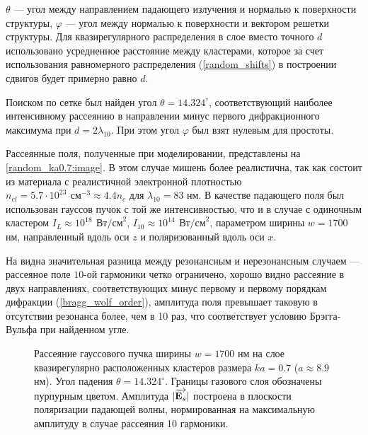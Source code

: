  $\theta$ --- угол между направлением падающего излучения и нормалью к поверхности структуры, $\varphi$ --- угол между нормалью к поверхности и вектором решетки структуры. Для квазирегулярного распределения в слое вместо точного $d$ использовано усредненное расстояние между кластерами, которое за счет использования равномерного распределения (\autoref{random_shifts}) в построении сдвигов будет примерно равно $d$.

Поиском по сетке был найден угол $\theta = 14.324^{\circ}$, соответствующий наиболее интенсивному рассеянию в направлении минус первого дифракционного максимума при $d = 2\lambda_{10}$. При этом угол $\varphi$ был взят нулевым для простоты.

Рассеянные поля, полученные при моделировании, представлены на \autoref{random_ka0.7:image}. В этом случае мишень более реалистична, так как состоит из материала с реалистичной электронной плотностью $n_{el} = 5.7 \cdot 10^{23}\:\,\textrm{см}^{-3} \approx 4.4 n_{c}$ для $\lambda_{10} = 83$ нм. В качестве падающего поля был использован гауссов пучок с той же интенсивностью, что и в случае с одиночным кластером $I_{L} \approx 10^{18}\:\,\textrm{Вт/см}^2$, $I_{10} \approx 10^{14}\:\,\textrm{Вт/см}^2$, параметром ширины $w = 1700$ нм, направленный вдоль оси $z$ и поляризованный вдоль оси $x$.

На  видна значительная разница между резонансным и нерезонансным случаем --- рассеяное поле $10$-ой гармоники четко ограничено, хорошо видно рассеяние в двух направлениях, соответствующих минус первому и первому порядкам дифракции (\autoref{bragg_wolf_order}), амплитуда поля превышает таковую в отсутствии резонанса более, чем в 10 раз, что соответствует условию Брэгга-Вульфа при найденном угле.

    \begin{figure}[H]
        \hfil
        \caption{Рассеяние гауссового пучка ширины $w = 1700$ нм на слое квазирегулярно расположенных кластеров размера $ka = 0.7$ ($a \approx 8.9$ нм). Угол падения $\theta = 14.324^{\circ}$. Границы газового слоя обозначены пурпурным цветом. Амплитуда $|\overrightarrow{\textbf{E}_{s}}|$ построена в плоскости поляризации падающей волны, нормированная на максимальную амплитуду в случае рассеяния 10 гармоники.}\label{random_ka0.7:image}
    \end{figure}

